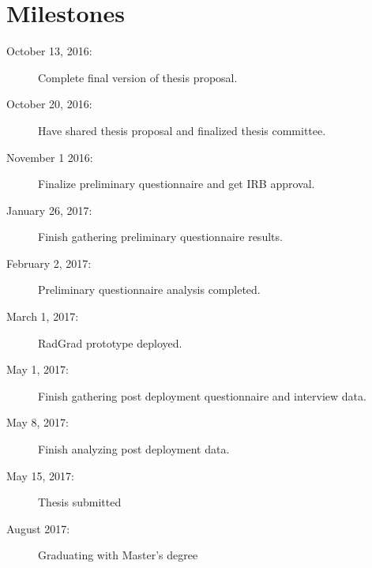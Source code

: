 \chapter{Milestones}
\begin{description}
\item[October 13, 2016:] Complete final version of thesis proposal. 
\item[October 20, 2016:] Have shared thesis proposal and finalized thesis committee.
\item[November 1 2016:] Finalize preliminary questionnaire and get IRB approval.
\item[January 26, 2017:] Finish gathering preliminary questionnaire results.
\item[February 2, 2017:] Preliminary questionnaire analysis completed.
\item[March 1, 2017:] RadGrad prototype deployed.
\item[May 1, 2017:] Finish gathering post deployment questionnaire and interview data.
\item[May 8, 2017:] Finish analyzing post deployment data.
\item[May 15, 2017:] Thesis submitted
\item[August 2017:] Graduating with Master's degree
\end{description}